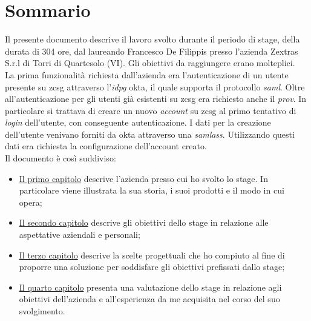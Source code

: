 
\cleardoublepage
{}
{}
\begingroup
\let\clearpage\relax
\let\cleardoublepage\relax
\let\cleardoublepage\relax

\chapter*{Sommario}

Il presente documento descrive il lavoro svolto durante il periodo di stage, della durata di 304 ore, dal laureando Francesco De Filippis presso l'azienda Zextras S.r.l di Torri di Quartesolo (VI).
Gli obiettivi da raggiungere erano molteplici.\\
La prima funzionalità richiesta dall'azienda era l'autenticazione di un utente presente su \gls{zcsg} attraverso l'\textit{\gls{idpg}} \gls{okta}, il quale supporta il protocollo \textit{\gls{saml}}.
Oltre all'autenticazione per gli utenti già esistenti su \gls{zcsg} era richiesto anche il \textit{\gls{prov}}. In particolare si trattava di creare un nuovo \textit{account} su \gls{zcsg} al primo tentativo di \textit{login} dell'utente, con conseguente autenticazione. I dati per la creazione dell'utente venivano forniti da \gls{okta} attraverso una \textit{\gls{samlass}}. Utilizzando questi dati era richiesta la configurazione dell'account creato.\\
Il documento è così suddiviso:
\begin{itemize}
    \item \hyperref[cap:azienda]{Il primo capitolo} descrive l'azienda presso cui ho svolto lo stage. In particolare viene illustrata la sua storia, i suoi prodotti e il modo in cui opera;
    \item \hyperref[cap:obiettivi]{Il secondo capitolo} descrive gli obiettivi dello stage
    in relazione alle aspettative aziendali e personali;
    \item \hyperref[cap:resoconto]{Il terzo capitolo} descrive la scelte progettuali che ho compiuto al fine di proporre una soluzione per soddisfare gli obiettivi prefissati dallo stage;
    \item \hyperref[cap:retrospettiva]{Il quarto capitolo} presenta una valutazione dello stage in relazione agli obiettivi dell'azienda e all'esperienza da me acquisita nel corso del suo svolgimento.
\end{itemize}

%
%

\endgroup			

\vfill

